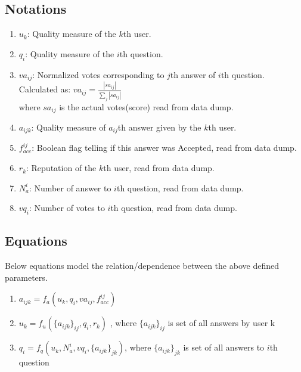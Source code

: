 \documentclass{article}
\begin{document}
\subsection{Notations}
\begin{enumerate}
    \item $u_k$: Quality measure of the $k$th user.
    \item $q_i$: Quality measure of the $i$th question.
    \item $va_{ij}$: Normalized votes corresponding to $j$th answer of $i$th question. \\
        Calculated as: $va_{ij} = \frac{|sa_{ij}|}{\sum_{j} |sa_{ij}|}$ \\
        where $sa_{ij}$ is the actual votes(score) read from data dump.
    \item $a_{ijk}$: Quality measure of $a_{ij}$th answer given by the $k$th user.
    \item $f_{acc}^{ij}$: Boolean flag telling if this answer was Accepted, read from data dump.
    \item $r_k$: Reputation of the $k$th user, read from data dump.
    \item $N_{a}^{i}$: Number of answer to $i$th question, read from data dump.
    \item $vq_{i}$: Number of votes to $i$th question, read from data dump.
\end{enumerate}

\subsection{Equations}
Below equations model the relation/dependence between
the above defined parameters. \\
\begin{enumerate}
    \item $a_{ijk} = f_a(u_k, q_i, va_{ij}, f_{acc}^{ij})$
    \item $u_k = f_u(\{a_{ijk}\}_{ij}, q_i, r_k)$ , where $\{a_{ijk}\}_{ij}$
        is set of all answers by user k
    \item $q_i = f_q(u_k, N_{a}^{i}, vq_i, \{a_{ijk}\}_{jk})$, where $\{a_{ijk}\}_{jk}$
        is set of all answers to $i$th question
\end{enumerate}
\end{document}
